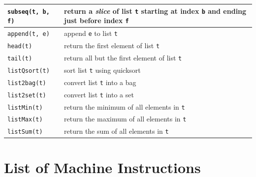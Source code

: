 \documentclass{report}
\begin{document}
\vspace{1em}
\begin{tabular}{|l|l|}
\hline
\texttt{subseq(t, b, f)} & return a \emph{slice} of list \texttt{t} starting
at index \texttt{b} and ending just before index \texttt{f}\\
\hline
\texttt{append(t, e)} & append \texttt{e} to list \texttt{t}\\
\hline
\texttt{head(t)} & return the first element of list \texttt{t}\\
\hline
\texttt{tail(t)} & return all but the first element of list \texttt{t}\\
\hline
\texttt{listQsort(t)} & sort list \texttt{t} using quicksort\\
\hline
\texttt{list2bag(t)} & convert list \texttt{t} into a bag \\
\hline
\texttt{list2set(t)} & convert list \texttt{t} into a set \\
\hline
\texttt{listMin(t)} & return the minimum of all elements in \texttt{t}\\
\hline
\texttt{listMax(t)} & return the maximum of all elements in \texttt{t}\\
\hline
\texttt{listSum(t)} & return the sum of all elements in \texttt{t}\\
\hline
\end{tabular}

\chapter{List of Machine Instructions}
\label{ap:cxlbytecode}
\end{document}
